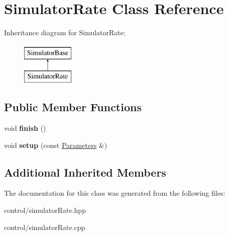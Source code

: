 \hypertarget{classSimulatorRate}{}\section{Simulator\+Rate Class Reference}
\label{classSimulatorRate}
Inheritance diagram for Simulator\+Rate\+:\begin{figure}[H]
\begin{center}
\leavevmode
\includegraphics[height=2.000000cm]{classSimulatorRate}
\end{center}
\end{figure}
\subsection*{Public Member Functions}
\begin{DoxyCompactItemize}
\item 
\mbox{\label{classSimulatorRate_a1d7ef6edfaa042ef54231709251fd9b4}} 
void {\bfseries finish} ()
\item 
\mbox{\label{classSimulatorRate_a42e01c94f488c76b918e5cfbff8c7909}} 
void {\bfseries setup} (const \mbox{\hyperlink{classParameters}{Parameters}} \&)
\end{DoxyCompactItemize}
\subsection*{Additional Inherited Members}


The documentation for this class was generated from the following files\+:\begin{DoxyCompactItemize}
\item 
control/simulator\+Rate.\+hpp\item 
control/simulator\+Rate.\+cpp\end{DoxyCompactItemize}
